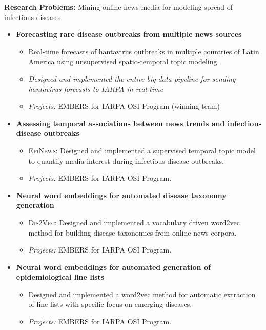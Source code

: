 \par{\textbf{Research Problems:} Mining online news media for modeling spread of infectious diseases\vspace{0.5em}
\begin{itemize}
 \item  \textbf{Forecasting rare disease outbreaks from multiple news sources}
   \begin{itemize}
     \item Real-time forecasts of hantavirus outbreaks in multiple countries of Latin America using unsupervised spatio-temporal topic modeling.
     \item \textit{Designed and implemented the entire big-data pipeline for sending hantavirus forecasts to IARPA in real-time}  
     \item \textit{Projects:} EMBERS for IARPA OSI Program (winning team)
   \end{itemize}\vspace{0.25em}
 \item \textbf{Assessing temporal associations between news trends and infectious disease outbreaks}
   \begin{itemize}
     \item {\textsc{EpiNews}}: Designed and implemented a supervised temporal topic model to quantify media interest during infectious disease outbreaks.
     \item \textit{Projects:} EMBERS for IARPA OSI Program.
   \end{itemize}\vspace{0.25em}
 \item \textbf{Neural word embeddings for automated disease taxonomy generation}
   \begin{itemize}
     \item {\textsc{Dis2Vec}}: Designed and implemented a vocabulary driven word2vec method for building disease taxonomies 
                               from online news corpora.
     \item \textit{Projects:} EMBERS for IARPA OSI Program.
   \end{itemize}
 \item \textbf{Neural word embeddings for automated generation of epidemiological line lists}
   \begin{itemize}
     \item Designed and implemented a word2vec method for automatic extraction of line lists with specific focus on emerging diseases.
     \item \textit{Projects:} EMBERS for IARPA OSI Program.
   \end{itemize}
\end{itemize}
}
